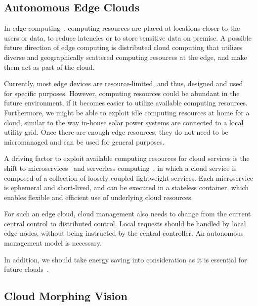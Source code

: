 \subsection{Autonomous Edge Clouds}

In edge computing~\cite{Lopez-2015},
computing resources are placed at locations closer to the users or
data, to reduce latencies or to store sensitive data on premise.
A possible future direction of edge computing is distributed cloud
computing that utilizes diverse and geographically scattered computing
resources at the edge, and make them act as part of the cloud.

Currently, most edge devices are resource-limited, and thus, designed
and used for specific purposes.
However, computing resources could be abundant in the future environment,
if it becomes easier to utilize available computing resources.
Furthermore, we might be able to exploit idle computing resources at
home for a cloud, similar to the way in-house solar power systems are
connected to a local utility grid.
Once there are enough edge resources, they do not need to be
micromanaged and can be used for general purposes.

A driving factor to exploit available computing resources for cloud
services is the shift to microservices~\cite{nadareishvili2016microservice}
and serverless computing~\cite{Shafiei-2022},
in which a cloud service is composed of a collection of loosely-coupled
lightweight services.
Each microservice is ephemeral and short-lived, and can be executed
in a stateless container,
which enables flexible and efficient use of underlying cloud
resources.

For such an edge cloud, cloud management also needs to change from
the current central control to distributed control.
Local requests should be handled by local edge nodes, without
being instructed by the central controller.
An autonomous management model is necessary.

In addition, we should take energy saving into consideration as it is
essential for future clouds~\cite{Mastelic-2015,masanet2020recalibrating}.

\subsection{Cloud Morphing Vision}

